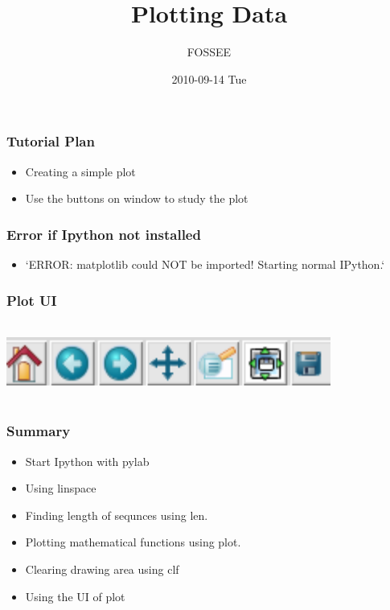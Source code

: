 \documentclass[presentation]{beamer}
\title{Plotting Data }
\author{FOSSEE}
\date{2010-09-14 Tue}
\begin{document}
\maketitle

\begin{frame}
\frametitle{Tutorial Plan}
\label{sec-1}
\begin{itemize}

\item Creating a simple plot\\
\label{sec-1.1}%
\item Use the buttons on window to study the plot\\
\label{sec-1.2}%
\end{itemize} %
\end{frame}
\begin{frame}
\frametitle{Error if Ipython not installed}
\label{sec-2}
\begin{itemize}

\item `ERROR: matplotlib could NOT be imported!  Starting normal IPython.`\\
\label{sec-2.1}%
\end{itemize} %
\end{frame}
\begin{frame}
\frametitle{Plot UI}
\label{sec-3}
\begin{frame}
 \begin{center}
    \includegraphics[height=1.0in,width=4.2in]{buttons.png}
  \end{center}
\end{frame}

\frametitle{Summary}
\label{sec-4}
\begin{itemize}

\item Start Ipython with pylab\\
\label{sec-4.1}%
\item Using linspace\\
\label{sec-4.2}%
\item Finding length of sequnces using  len.\\
\label{sec-4.3}%
\item Plotting mathematical functions using plot.\\
\label{sec-4.4}%
\item Clearing drawing area using clf\\
\label{sec-4.5}%
\item Using the UI of plot\\
\label{sec-4.6}%
\end{itemize} %
\end{frame}
\end{document}
